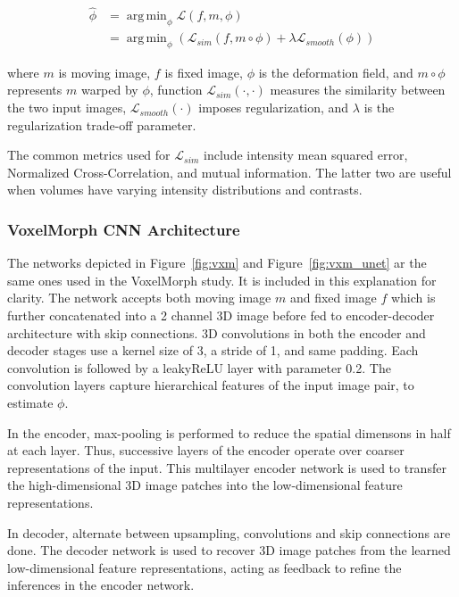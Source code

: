 \documentclass{book}
\DeclareMathOperator*{\argmin}{arg\,min}
\begin{document}
	
	\begin{equation} \label{loss_vxm}
	\begin{split}
	\hat{\phi} & = \argmin_\phi \mathcal{L}(f,m,\phi) \\
	& = \argmin_\phi (\mathcal{L}_{sim}(f,m \circ \phi) + \lambda \mathcal{L}_{smooth}(\phi))
	\end{split}
	\end{equation}
	
	where $m$ is moving image, $f$ is fixed image, $\phi$ is the deformation field, and $m \circ \phi$ represents $m$ warped by $\phi$, function $\mathcal{L}_{sim}(\cdot,\cdot)$ measures the similarity between the two input images, $\mathcal{L}_{smooth}(\cdot)$ imposes regularization, and $\lambda$ is the regularization trade-off parameter.
	
	The common metrics used for $\mathcal{L}_{sim}$ include intensity mean squared error, Normalized Cross-Correlation, and mutual information. The latter two are useful when volumes have varying intensity distributions and contrasts.
	
	\subsubsection{VoxelMorph CNN Architecture}
	
	The networks depicted in Figure~\ref{fig:vxm} and Figure~\ref{fig:vxm_unet} ar the same ones used in the VoxelMorph \cite{Balakrishnan_2019} study. It is included in this explanation for clarity. The network accepts both moving image $m$ and fixed image $f$ which is further concatenated into a 2 channel 3D image before fed to encoder-decoder architecture with skip connections. 3D convolutions in both the encoder and decoder stages use a kernel size of 3, a stride of 1, and same padding. Each convolution is followed by a leakyReLU layer with parameter 0.2. The convolution layers capture hierarchical features of the input image pair, to estimate $\phi$.
	
	In the encoder, max-pooling is performed to reduce the spatial dimensons in half at each layer. Thus, successive layers of the encoder operate over coarser representations of the input. This multilayer encoder network is used to transfer the high-dimensional 3D image patches into the low-dimensional feature representations.
	
	In decoder, alternate between upsampling, convolutions and skip connections are done. The decoder network is used to recover 3D image patches from the learned low-dimensional feature representations, acting as feedback to refine the inferences in the encoder network.
	
\end{document}
